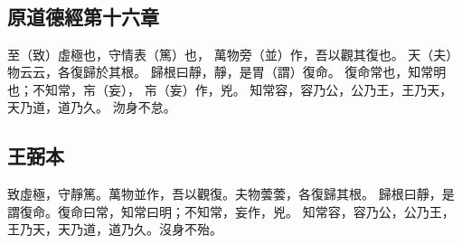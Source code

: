 ﻿%
%

\chapter{~}

\section{原道德經第十六章}

\begin{withgezhu}

\zhsong


至（\textcolor{tongjia-color}{致}）虛極也，守情表（\textcolor{tongjia-color}{篤}）也，
萬物旁（\textcolor{tongjia-color}{並}）作，吾以觀其復也。
天（\textcolor{tongjia-color}{夫}）物云云，各復歸於其\colorbox{adding-color}{根}。
\textcolor{wangbi-color}{歸根}\colorbox{adding-color}{曰靜}，靜，是胃（\textcolor{tongjia-color}{謂}）復命。
復命常也，知常明也；不知常，㠵（\textcolor{tongjia-color}{妄}），
㠵（\textcolor{tongjia-color}{妄}）作，兇。
知常容，容乃公，公乃王，\colorbox{missing-color}{王}乃天，天乃道，\colorbox{adding-color}{道乃}\textcolor{wangbi-color}{久}。
沕身不怠。

\end{withgezhu}

\section{王弼本}

\begin{withgezhu}

\zhsong

致虛極，守靜篤。萬物並作，吾以觀復。夫物蕓蕓，各復歸其根。
歸根曰靜，是謂復命。復命曰常，知常曰明；不知常，妄作，兇。
知常容，容乃公，公乃王，王乃天，天乃道，道乃久。沒身不殆。

\end{withgezhu}
